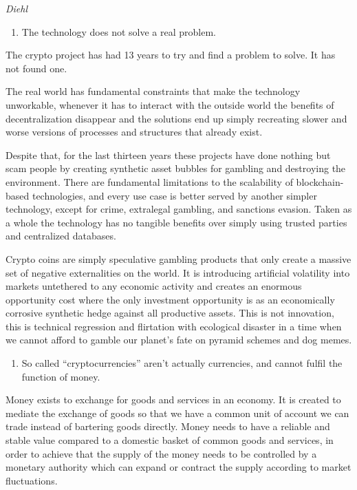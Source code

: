 \documentclass[
]{book}
\providecommand{\tightlist}{%
  \setlength{\itemsep}{0pt}\setlength{\parskip}{0pt}}
\begin{document}
\emph{Diehl}

\begin{enumerate}
\def\labelenumi{\arabic{enumi}.}
\tightlist
\item
  The technology does not solve a real problem.
\end{enumerate}

The crypto project has had 13 years to try and find a problem to solve. It has not found one.

The real world has fundamental constraints that make the technology unworkable, whenever it has to interact with the outside world the benefits of decentralization disappear and the solutions end up simply recreating slower and worse versions of processes and structures that already exist.

Despite that, for the last thirteen years these projects have done nothing but scam people by creating synthetic asset bubbles for gambling and destroying the environment. There are fundamental limitations to the scalability of blockchain-based technologies, and every use case is better served by another simpler technology, except for crime, extralegal gambling, and sanctions evasion. Taken as a whole the technology has no tangible benefits over simply using trusted parties and centralized databases.

Crypto coins are simply speculative gambling products that only create a massive set of negative externalities on the world. It is introducing artificial volatility into markets untethered to any economic activity and creates an enormous opportunity cost where the only investment opportunity is as an economically corrosive synthetic hedge against all productive assets. This is not innovation, this is technical regression and flirtation with ecological disaster in a time when we cannot afford to gamble our planet's fate on pyramid schemes and dog memes.

\begin{enumerate}
\def\labelenumi{\arabic{enumi}.}
\setcounter{enumi}{1}
\tightlist
\item
  So called ``cryptocurrencies'' aren't actually currencies, and cannot fulfil the function of money.
\end{enumerate}

Money exists to exchange for goods and services in an economy. It is created to mediate the exchange of goods so that we have a common unit of account we can trade instead of bartering goods directly. Money needs to have a reliable and stable value compared to a domestic basket of common goods and services, in order to achieve that the supply of the money needs to be controlled by a monetary authority which can expand or contract the supply according to market fluctuations.
\end{document}
